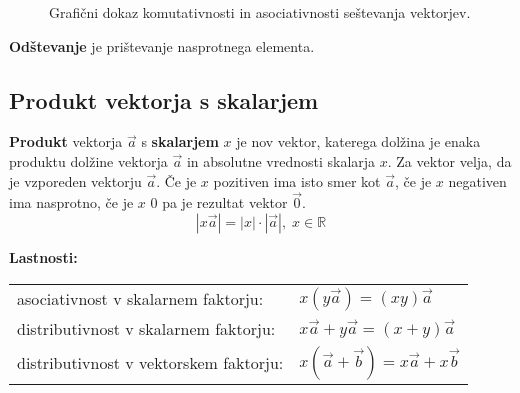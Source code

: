 \documentclass[a4paper,oneside,12pt,fleqn]{article}
\def\R{\ensuremath{\mathbb R}}
\newcommand\krat\cdot
\newcommand{\beforecaptionskip}{\vspace{-12pt}}
\numberwithin{equation}{section}
\begin{document}
\begin{figure}[ht]
   \begin{center}
  \end{center}
  \beforecaptionskip
  \caption{Grafični dokaz komutativnosti in asociativnosti seštevanja vektorjev.}
  \label{fig:vec:sest:zak}
\end{figure}

\textbf{Odštevanje} je prištevanje nasprotnega elementa.

\subsection{Produkt vektorja s skalarjem}
\label{sec:vec:vecskal}
\textbf{Produkt} vektorja $\vec{a}$ s \textbf{skalarjem} $x$ je nov vektor, katerega dolžina je enaka
produktu dolžine vektorja $\vec{a}$ in absolutne vrednosti skalarja $x$. Za vektor velja,
da je vzporeden vektorju $\vec{a}$. Če je $x$ pozitiven ima isto smer kot $\vec{a}$, če je
$x$ negativen ima nasprotno, če je $x$ 0 pa je rezultat vektor $\vec{0}$.
\[ \left| x\vec{a} \right| = \left| x \right| \krat \left| \vec{a} \right|, \; x \in \R \] 

\textbf{Lastnosti:}\\[6pt]
\begin{tabular}[h!]{ll}
  asociativnost v skalarnem faktorju:    & $x(y\vec{a}) = (xy)\vec{a}$ \\
  distributivnost v skalarnem faktorju:  & $x\vec{a} + y\vec{a} = (x+y)\vec{a}$ \\
  distributivnost v vektorskem faktorju: & $x(\vec{a} + \vec{b}) = x\vec{a} + x\vec{b}$
\end{tabular}
\end{document}
